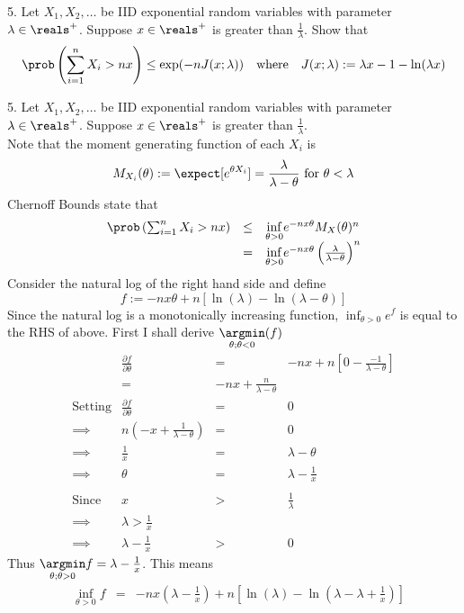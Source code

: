 \documentclass[11pt,a4paper]{article}
\begin{document}
\begin{question}{5.}
  Let $X_1,X_2,\dots$ be IID exponential random variables with parameter $\lambda\in\reals^+$. Suppose $x\in\reals^+$ is greater than $\frac1\lambda$. Show that
  \[ \prob\left(\sum_{i=1}^nX_i>nx\right)\leq\exp(-nJ(x;\lambda))\quad\text{where}\quad J(x;\lambda):=\lambda x-1-\ln(\lambda x) \]
\end{question}

\begin{answer}{5.}
  Let $X_1,X_2,\dots$ be IID exponential random variables with parameter $\lambda\in\reals^+$. Suppose $x\in\reals^+$ is greater than $\frac1\lambda$.\\
  Note that the moment generating function of each $X_i$ is
  \[ M_{X_i}(\theta):=\expect[e^{\theta X_i}]=\frac\lambda{\lambda-\theta}\text{ for }\theta<\lambda \]
  Chernoff Bounds state that
  \[\begin{array}{rcl}
    \prob\left(\sum_{i=1}^nX_i>nx\right)&\leq&\underset{\theta>0}\inf e^{-nx\theta}M_X(\theta)^n\\
    &=&\underset{\theta>0}\inf e^{-nx\theta}\left(\frac{\lambda}{\lambda-\theta}\right)^n
  \end{array}\]
  Consider the natural log of the right hand side and define
  \[ f:=-nx\theta+n[\ln(\lambda)-\ln(\lambda-\theta)] \]
  Since the natural log is a monotonically increasing function, $\inf_{\theta>0}e^f$ is equal to the RHS of above. First I shall derive $\underset{\theta;\theta<0}\argmin(f)$
  \[\begin{array}{rrcl}
    &\frac{\partial f}{\partial \theta}&=&-nx+n\left[0-\frac{-1}{\lambda-\theta}\right]\\
    &=&-nx+\frac{n}{\lambda-\theta}\\
    \text{Setting}&\frac{\partial f}{\partial \theta}&=&0\\
    \implies&n\left(-x+\frac1{\lambda-\theta}\right)&=&0\\
    \implies&\frac1x&=&\lambda-\theta\\
    \implies&\theta&=&\lambda-\frac1x\\\\
    \text{Since}&x&>&\frac1\lambda\\
    \implies&\lambda>\frac1x\\
    \implies&\lambda-\frac1x&>&0
  \end{array}\]
  Thus $\underset{\theta;\theta>0}\argmin f=\lambda-\frac1x$. This means
  \[\begin{array}{rrcl}
    &\underset{\theta>0}\inf f&=&-nx\left(\lambda-\frac1x\right)+n\left[\ln(\lambda)-\ln\left(\lambda-\lambda+\frac1x\right)\right]\\

\end{array}\]
\end{answer}
\end{document}
